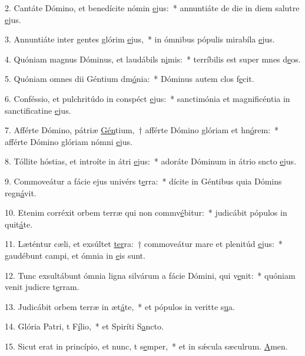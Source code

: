 2. Cantáte Dómino, et benedícite nómin \uline{e}jus:~* annuntiáte de die in diem salutre \uline{e}jus.\par 
3. Annuntiáte inter gentes glórim \uline{e}jus,~* in ómnibus pópulis mirabíla \uline{e}jus.\par 
4. Quóniam magnus Dóminus, et laudábils n\uline{i}mis:~* terríbilis est super mnes d\uline{e}os.\par 
5. Quóniam omnes dii Géntium dm\uline{ó}nia:~* Dóminus autem clos f\uline{e}cit.\par 
6. Conféssio, et pulchritúdo in conspéct \uline{e}jus:~* sanctimónia et magnificéntia in sanctificatine \uline{e}jus.\par 
7. Afférte Dómino, pátriæ \uline{Gén}tium,~† afférte Dómino glóriam et hn\uline{ó}rem:~* afférte Dómino glóriam nómni \uline{e}jus.\par 
8. Tóllite hóstias, et introíte in átri \uline{e}jus:~* adoráte Dóminum in átrio sncto \uline{e}jus.\par 
9. Commoveátur a fácie ejus univérs t\uline{e}rra:~* dícite in Géntibus quia Dómins regn\uline{á}vit.\par 
10. Etenim corréxit orbem terræ qui non commv\uline{é}bitur:~* judicábit pópulos in quit\uline{á}te.\par 
11. Læténtur cæli, et exsúltet \uline{ter}ra:~† commoveátur mare et plenitúd \uline{e}jus:~* gaudébunt campi, et ómnia  in \uline{e}is sunt.\par 
12. Tunc exsultábunt ómnia ligna silvárum a fácie Dómini, qui v\uline{e}nit:~* quóniam venit judicre t\uline{e}rram.\par 
13. Judicábit orbem terræ in æt\uline{á}te,~* et pópulos in veritte s\uline{u}a.\par 
14. Glória Patri, t F\uline{í}lio,~* et Spiríti S\uline{a}ncto.\par 
15. Sicut erat in princípio, et nunc, t s\uline{e}mper,~* et in sǽcula sæculrum. \uline{A}men.\par 
